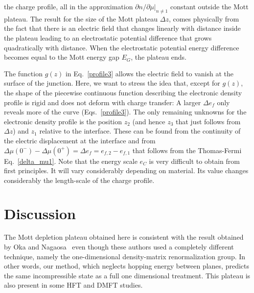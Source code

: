 \documentclass[twocolumn, preprintnumbers,prb,aps,amssymb,showpacs]{revtex4}
\begin{document}
the charge profile, all in the approximation $\left. \partial n/\partial \mu \right\vert
_{n\neq 1}$ constant outside the Mott plateau. The result for the size of the Mott plateau $\Delta z$, comes physically from the fact that there is an electric field that changes linearly with distance inside the plateau leading to an electrostatic potential difference that grows quadratically with distance. When the electrostatic potential energy difference becomes equal to the Mott energy gap $E_G$, the plateau ends.

The function $g\left( z\right)$ in Eq.~\eqref{profile3} allows the electric field to vanish at the surface of the junction. Here, we want to stress the idea that, except for $%
g\left( z\right) $, the shape of the piecewise continuous function describing the electronic density profile is rigid and
does not deform with charge transfer: A larger $\Delta e_{f}$ only reveals
more of the curve (Eqs.~\eqref{profile3}). The only remaining unknowns for the electronic density profile is the position $z_{2}$
(and hence $z_{3}$ that just follows from $\Delta z$) and $z_{1}$ relative to the interface. These can be found from the continuity of the electric
displacement at the interface and from $\Delta\mu(0^-)-\Delta\mu(0^+)=\Delta e_{f}=e_{f,2}-e_{f,1}$ that follows from the Thomas-Fermi Eq.~\eqref{delta_mu1}. Note that the energy
scale $e_{C}$ is very difficult to obtain from first principles. It will vary considerably depending on material. Its value changes considerably the length-scale of the charge profile.

\section{Discussion}\label{Discussion}

The Mott depletion plateau obtained here is consistent with the result obtained by Oka and Nagaosa~\cite{oka_interfaces_2005} even though these authors used a completely different technique, namely the one-dimensional density-matrix renormalization group. In other words, our method, which neglects hopping energy between planes, predicts the same incompressible state as a full one dimensional treatment. This plateau is also present in some HFT \cite{yunoki_electron_2007} and DMFT \cite{ishida_embedding_2009} studies.
\end{document}
